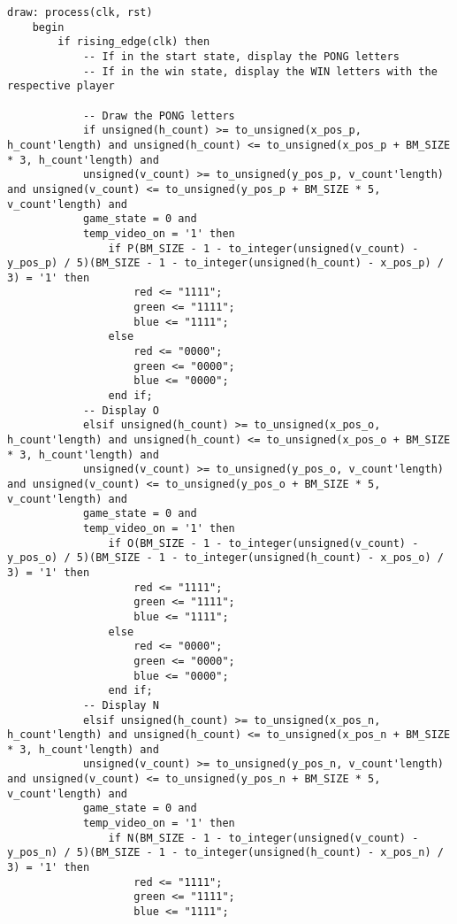 \documentclass{article}
\begin{document}
\begin{lstlisting}[caption=Draw Process, label=lst:draw-process]
	draw: process(clk, rst)
	begin
		if rising_edge(clk) then
		    -- If in the start state, display the PONG letters
		    -- If in the win state, display the WIN letters with the respective player

            -- Draw the PONG letters
            if unsigned(h_count) >= to_unsigned(x_pos_p, h_count'length) and unsigned(h_count) <= to_unsigned(x_pos_p + BM_SIZE * 3, h_count'length) and
            unsigned(v_count) >= to_unsigned(y_pos_p, v_count'length) and unsigned(v_count) <= to_unsigned(y_pos_p + BM_SIZE * 5, v_count'length) and
            game_state = 0 and
            temp_video_on = '1' then
                if P(BM_SIZE - 1 - to_integer(unsigned(v_count) - y_pos_p) / 5)(BM_SIZE - 1 - to_integer(unsigned(h_count) - x_pos_p) / 3) = '1' then
                    red <= "1111";
                    green <= "1111";
                    blue <= "1111";
                else
                    red <= "0000";
                    green <= "0000";
                    blue <= "0000";
                end if;
            -- Display O
            elsif unsigned(h_count) >= to_unsigned(x_pos_o, h_count'length) and unsigned(h_count) <= to_unsigned(x_pos_o + BM_SIZE * 3, h_count'length) and
            unsigned(v_count) >= to_unsigned(y_pos_o, v_count'length) and unsigned(v_count) <= to_unsigned(y_pos_o + BM_SIZE * 5, v_count'length) and
            game_state = 0 and
            temp_video_on = '1' then
                if O(BM_SIZE - 1 - to_integer(unsigned(v_count) - y_pos_o) / 5)(BM_SIZE - 1 - to_integer(unsigned(h_count) - x_pos_o) / 3) = '1' then
                    red <= "1111";
                    green <= "1111";
                    blue <= "1111";
                else
                    red <= "0000";
                    green <= "0000";
                    blue <= "0000";
                end if;
            -- Display N
            elsif unsigned(h_count) >= to_unsigned(x_pos_n, h_count'length) and unsigned(h_count) <= to_unsigned(x_pos_n + BM_SIZE * 3, h_count'length) and
            unsigned(v_count) >= to_unsigned(y_pos_n, v_count'length) and unsigned(v_count) <= to_unsigned(y_pos_n + BM_SIZE * 5, v_count'length) and
            game_state = 0 and
            temp_video_on = '1' then
                if N(BM_SIZE - 1 - to_integer(unsigned(v_count) - y_pos_n) / 5)(BM_SIZE - 1 - to_integer(unsigned(h_count) - x_pos_n) / 3) = '1' then
                    red <= "1111";
                    green <= "1111";
                    blue <= "1111";

\end{lstlisting}
\end{document}
